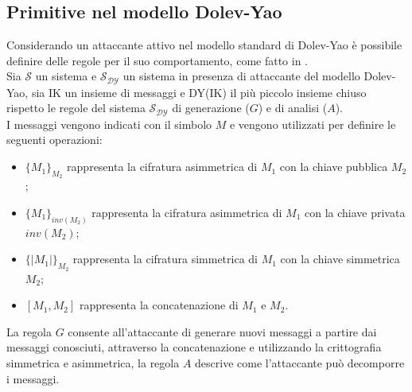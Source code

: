 \subsection{Primitive nel modello Dolev-Yao}
Considerando un attaccante attivo nel modello standard di Dolev-Yao è possibile definire delle regole per il suo comportamento, come fatto in \cite{RVV17}.\\
Sia $\mathcal{S}$ un sistema e $\mathcal{S_{DY}}$ un sistema in presenza di attaccante del modello Dolev-Yao, sia IK un insieme di messaggi e DY(IK) il più piccolo insieme chiuso rispetto le regole del sistema  $\mathcal{S_{DY}}$ di generazione ($G$) e di analisi ($A$).\\
I messaggi vengono indicati con il simbolo $M$ e vengono utilizzati per definire le seguenti operazioni:
\begin{itemize}
    \item $\{M_1\}_{M_2}$ rappresenta la cifratura asimmetrica di $M_1$ con la chiave pubblica $M_2$;
    \item $\{M_1\}_{inv(M_2)}$ rappresenta la cifratura asimmetrica di $M_1$ con la chiave privata $inv(M_2)$;
    \item $\{|M_1|\}_{M_2}$ rappresenta la cifratura simmetrica di $M_1$ con la chiave simmetrica $M_2$;
    \item $[M_1,M_2]$ rappresenta la concatenazione di $M_1$ e $M_2$.
\end{itemize}
La regola $G$ consente all'attaccante di generare nuovi messaggi a partire dai messaggi conosciuti, attraverso la concatenazione e utilizzando la crittografia simmetrica e asimmetrica, la regola $A$ descrive come l'attaccante può decomporre i messaggi. 

